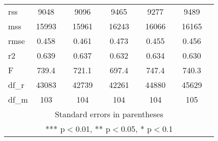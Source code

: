 \documentclass[]{article}
\begin{document}
\begin{tabular}{lcccccccccc}
rss & 9048 &  & 9096 &  & 9465 &  & 9277 &  & 9489 &  \\
mss & 15993 &  & 15961 &  & 16243 &  & 16066 &  & 16165 &  \\
rmse & 0.458 &  & 0.461 &  & 0.473 &  & 0.455 &  & 0.456 &  \\
r2 & 0.639 &  & 0.637 &  & 0.632 &  & 0.634 &  & 0.630 &  \\
F & 739.4 &  & 721.1 &  & 697.4 &  & 747.4 &  & 740.3 &  \\
df\_r & 43083 &  & 42739 &  & 42261 &  & 44880 &  & 45629 &  \\
 df\_m & 103 &  & 104 &  & 104 &  & 104 &  & 105 &  \\ \hline
\multicolumn{11}{c}{ Standard errors in parentheses} \\
\multicolumn{11}{c}{ *** p$<$0.01, ** p$<$0.05, * p$<$0.1} \\
\end{tabular}
\end{document}
